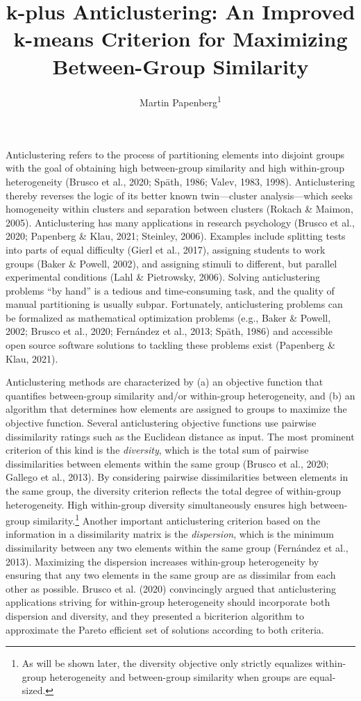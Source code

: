 \documentclass[
  man,floatsintext]{apa7}
\title{k-plus Anticlustering: An Improved k-means Criterion for Maximizing Between-Group Similarity}
\author{Martin Papenberg\textsuperscript{1}}
\date{}
\affiliation{\vspace{0.5cm}\textsuperscript{1} Heinrich Heine University Düsseldorf}
\begin{document}
\maketitle

Anticlustering refers to the process of partitioning elements into disjoint groups with the goal of obtaining high between-group similarity and high within-group heterogeneity (Brusco et al., 2020; Späth, 1986; Valev, 1983, 1998). Anticlustering thereby reverses the logic of its better known twin---cluster analysis---which seeks homogeneity within clusters and separation between clusters (Rokach \& Maimon, 2005). Anticlustering has many applications in research psychology (Brusco et al., 2020; Papenberg \& Klau, 2021; Steinley, 2006). Examples include splitting tests into parts of equal difficulty (Gierl et al., 2017), assigning students to work groups (Baker \& Powell, 2002), and assigning stimuli to different, but parallel experimental conditions (Lahl \& Pietrowsky, 2006). Solving anticlustering problems ``by hand'' is a tedious and time-consuming task, and the quality of manual partitioning is usually subpar. Fortunately, anticlustering problems can be formalized as mathematical optimization problems (e.g., Baker \& Powell, 2002; Brusco et al., 2020; Fernández et al., 2013; Späth, 1986) and accessible open source software solutions to tackling these problems exist (Papenberg \& Klau, 2021).

Anticlustering methods are characterized by (a) an objective function that quantifies between-group similarity and/or within-group heterogeneity, and (b) an algorithm that determines how elements are assigned to groups to maximize the objective function. Several anticlustering objective functions use pairwise dissimilarity ratings such as the Euclidean distance as input. The most prominent criterion of this kind is the \emph{diversity}, which is the total sum of pairwise dissimilarities between elements within the same group (Brusco et al., 2020; Gallego et al., 2013). By considering pairwise dissimilarities between elements in the same group, the diversity criterion reflects the total degree of within-group heterogeneity. High within-group diversity simultaneously ensures high between-group similarity.\footnote{As will be shown later, the diversity objective only strictly equalizes within-group heterogeneity and between-group similarity when groups are equal-sized.} Another important anticlustering criterion based on the information in a dissimilarity matrix is the \emph{dispersion}, which is the minimum dissimilarity between any two elements within the same group (Fernández et al., 2013). Maximizing the dispersion increases within-group heterogeneity by ensuring that any two elements in the same group are as dissimilar from each other as possible. Brusco et al. (2020) convincingly argued that anticlustering applications striving for within-group heterogeneity should incorporate both dispersion and diversity, and they presented a bicriterion algorithm to approximate the Pareto efficient set of solutions according to both criteria.
\end{document}
